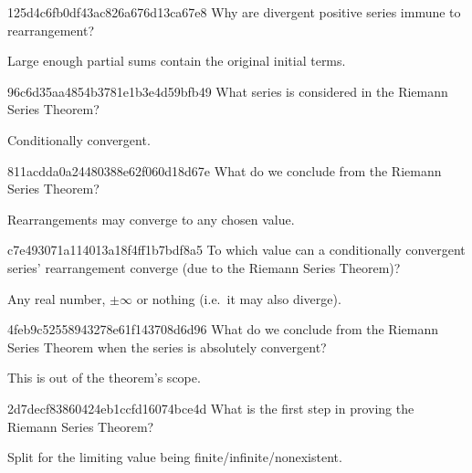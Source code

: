 \begin{note}{125d4c6fb0df43ac826a676d13ca67e8}
    Why are divergent positive series immune to rearrangement?

    \begin{cloze}{1}
        Large enough partial sums contain the original initial terms.
    \end{cloze}
\end{note}

\begin{note}{96c6d35aa4854b3781e1b3e4d59bfb49}
    What series is considered in the Riemann Series Theorem?

    \begin{cloze}{1}
        Conditionally convergent.
    \end{cloze}
\end{note}

\begin{note}{811acdda0a24480388e62f060d18d67e}
    What do we conclude from the Riemann Series Theorem?

    \begin{cloze}{1}
        Rearrangements may converge to any chosen value.
    \end{cloze}
\end{note}

\begin{note}{c7e493071a114013a18f4ff1b7bdf8a5}
    To which value can a conditionally convergent series' re\-ar\-range\-ment converge (due to the Riemann Series Theorem)?

    \begin{cloze}{1}
        Any real number, \({ \pm \infty }\) or nothing (i.e.\ it may also diverge).
    \end{cloze}
\end{note}

\begin{note}{4feb9c52558943278e61f143708d6d96}
    What do we conclude from the Riemann Series Theorem when the series is absolutely convergent?

    \begin{cloze}{1}
        This is out of the theorem's scope.
    \end{cloze}
\end{note}

\begin{note}{2d7decf83860424eb1ccfd16074bce4d}
    What is the first step in proving the Riemann Series Theorem?

    \begin{cloze}{1}
        Split for the limiting value being finite/infinite/nonexistent.
    \end{cloze}
\end{note}

